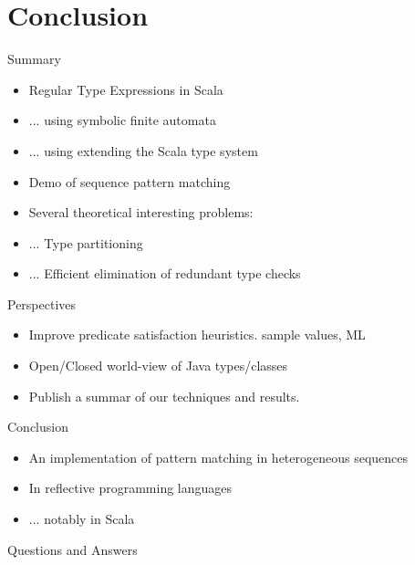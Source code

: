\section{Conclusion}

{  %
\begin{frame}{Summary}
  \begin{itemize}
  \item Regular Type Expressions in Scala
  \item ... using symbolic finite automata
  \item ... using  extending the Scala type system
  \item Demo of sequence pattern matching
  \item Several theoretical interesting problems:
  \item ... Type partitioning
  \item ... Efficient elimination of redundant type checks
  \end{itemize}
\end{frame}
}

\begin{frame}{Perspectives}
  \begin{itemize}
  \item Improve predicate satisfaction heuristics. \Eg sample values, ML
  \item Open/Closed world-view of Java types/classes
  \item Publish a summar of our techniques and results.
  \end{itemize}
\end{frame}

\begin{frame}{Conclusion}
  \begin{itemize}
  \item An implementation of pattern matching in heterogeneous sequences
  \item In reflective programming languages
  \item ... notably in Scala
  \end{itemize}
\end{frame}

\begin{frame}{Questions and Answers}
\end{frame}
